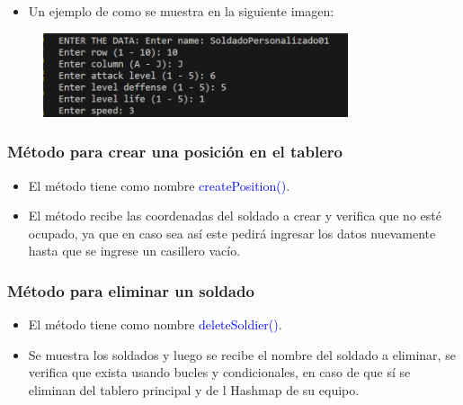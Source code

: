 \documentclass{article}
\begin{document}
\begin{itemize}\begin{itemize}\item Un ejemplo de como se muestra en la siguiente imagen:
\end{itemize}\end{itemize}
\begin{figure}[H]
    \centering
    \includegraphics[width=0.8\textwidth,keepaspectratio]{img/12createSoldier.png}
    \caption{}
\end{figure}


\subsubsection{Método para crear una posición en el tablero}
\begin{itemize}
    \item El método tiene como nombre \textcolor{blue}{createPosition()}.
    \item El método recibe las coordenadas del soldado a crear y verifica que no esté ocupado, ya que en caso sea así este pedirá ingresar los datos nuevamente hasta que se ingrese un casillero vacío.
\end{itemize}



\subsubsection{Método para eliminar un soldado}
\begin{itemize}
    \item El método tiene como nombre \textcolor{blue}{deleteSoldier()}.
    \item Se muestra los soldados y luego se recibe el nombre del soldado a eliminar, se verifica que exista usando bucles y condicionales, en caso de que sí se eliminan del tablero principal y de l Hashmap de su equipo.
\end{itemize}

\end{document}
